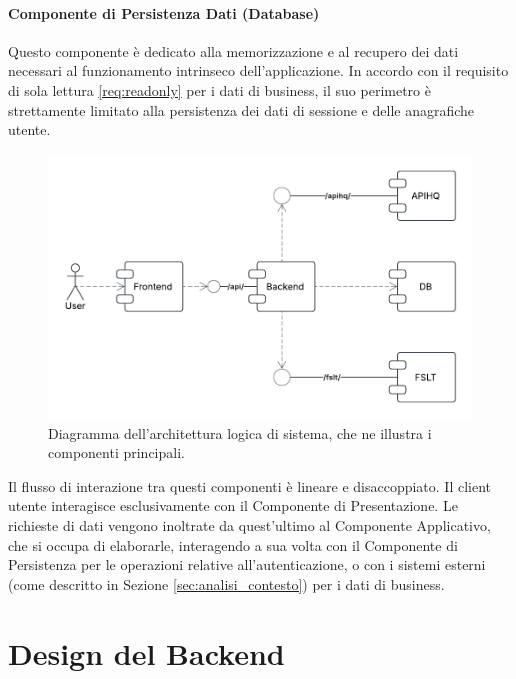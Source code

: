 \documentclass[12pt,a4paper,openright,twoside]{book}
\begin{document}
\paragraph{Componente di Persistenza Dati (Database)} Questo componente è dedicato alla memorizzazione e al recupero dei dati necessari al funzionamento intrinseco dell'applicazione. In accordo con il requisito di sola lettura \ref{req:readonly} per i dati di business, il suo perimetro è strettamente limitato alla persistenza dei dati di sessione e delle anagrafiche utente.


\begin{figure}[htbp]
    \centering
    \includegraphics[width=\textwidth]{figures/components.pdf}
    \caption{Diagramma dell'architettura logica di sistema, che ne illustra i componenti principali.}
    \label{fig:logical_architecture_diagram}
\end{figure}

\FloatBarrier



Il flusso di interazione tra questi componenti è lineare e disaccoppiato. Il client utente interagisce esclusivamente con il Componente di Presentazione. Le richieste di dati vengono inoltrate da quest'ultimo al Componente Applicativo, che si occupa di elaborarle, interagendo a sua volta con il Componente di Persistenza per le operazioni relative all'autenticazione, o con i sistemi esterni (come descritto in Sezione \ref{sec:analisi_contesto}) per i dati di business.




\section{Design del Backend}
\label{sec:design_backend_oop}
\end{document}
